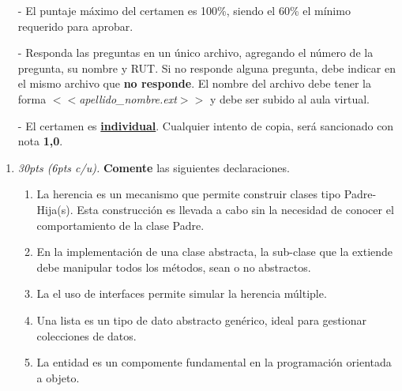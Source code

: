 \documentclass[10pt]{article}
\begin{document}
    {\scriptsize
    \begin{itemize}
        \item[-] El puntaje m\'aximo del certamen es 100\%, siendo el 60\% el m\'inimo requerido para aprobar.
        \item[-] Responda las preguntas en un \'unico archivo, agregando el n\'umero de la pregunta, su nombre y RUT. Si no responde alguna pregunta, debe indicar en el mismo archivo que \textbf{no responde}. El nombre del archivo debe tener la forma $<<$\emph{apellido\_nombre.ext}$>>$ y debe ser subido al aula virtual.
        \item[-] El certamen es \underline{\textbf{individual}}. Cualquier intento de copia, ser\'a sancionado con nota \textbf{1,0}.
    \end{itemize}
    
    \vspace*{-25pt}

    \begin{enumerate}

        \item \emph{30pts (6pts c/u).} \textbf{Comente} las siguientes declaraciones.
    
        \begin{enumerate}[label=(\alph*)]
            \item La herencia es un mecanismo que permite construir clases tipo Padre-Hija(s). Esta construcci\'on es llevada a cabo sin la necesidad de conocer el comportamiento de la clase Padre.
            \item En la implementaci\'on de una clase abstracta, la sub-clase que la extiende debe manipular todos los m\'etodos, sean o no abstractos.
            \item La el uso de interfaces permite simular la herencia m\'ultiple.  
            \item Una lista es un tipo de dato abstracto gen\'erico, ideal para gestionar colecciones de datos.
            \item La entidad es un compomente fundamental en la programaci\'on orientada a objeto.
        \end{enumerate}


\end{enumerate}}
\end{document}
